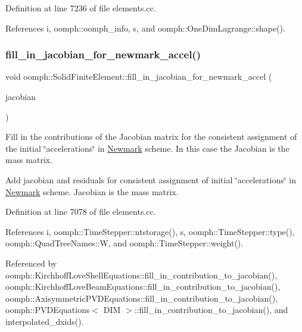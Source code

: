 Definition at line 7236 of file elements.\+cc.



References i, oomph\+::oomph\+\_\+info, s, and oomph\+::\+One\+Dim\+Lagrange\+::shape().

\mbox{\label{classoomph_1_1SolidFiniteElement_ae9b760377a56194d802510527b33c76f}} 
\subsubsection{\texorpdfstring{fill\+\_\+in\+\_\+jacobian\+\_\+for\+\_\+newmark\+\_\+accel()}{fill\_in\_jacobian\_for\_newmark\_accel()}}
{\footnotesize\ttfamily void oomph\+::\+Solid\+Finite\+Element\+::fill\+\_\+in\+\_\+jacobian\+\_\+for\+\_\+newmark\+\_\+accel (\begin{DoxyParamCaption}\item[{\hyperlink{classoomph_1_1DenseMatrix}{Dense\+Matrix}$<$ double $>$ \&}]{jacobian }\end{DoxyParamCaption})}



Fill in the contributions of the Jacobian matrix for the consistent assignment of the initial \char`\"{}accelerations\char`\"{} in \hyperlink{classoomph_1_1Newmark}{Newmark} scheme. In this case the Jacobian is the mass matrix. 

Add jacobian and residuals for consistent assignment of initial \char`\"{}accelerations\char`\"{} in \hyperlink{classoomph_1_1Newmark}{Newmark} scheme. Jacobian is the mass matrix. 

Definition at line 7078 of file elements.\+cc.



References i, oomph\+::\+Time\+Stepper\+::ntstorage(), s, oomph\+::\+Time\+Stepper\+::type(), oomph\+::\+Quad\+Tree\+Names\+::W, and oomph\+::\+Time\+Stepper\+::weight().



Referenced by oomph\+::\+Kirchhoff\+Love\+Shell\+Equations\+::fill\+\_\+in\+\_\+contribution\+\_\+to\+\_\+jacobian(), oomph\+::\+Kirchhoff\+Love\+Beam\+Equations\+::fill\+\_\+in\+\_\+contribution\+\_\+to\+\_\+jacobian(), oomph\+::\+Axisymmetric\+P\+V\+D\+Equations\+::fill\+\_\+in\+\_\+contribution\+\_\+to\+\_\+jacobian(), oomph\+::\+P\+V\+D\+Equations$<$ D\+I\+M $>$\+::fill\+\_\+in\+\_\+contribution\+\_\+to\+\_\+jacobian(), and interpolated\+\_\+dxids().

